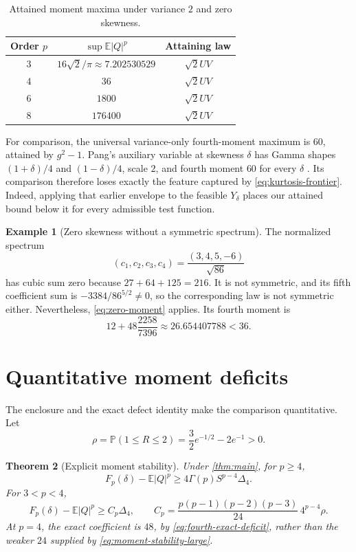 \documentclass[11pt]{article}
\numberwithin{equation}{section}
\newtheorem{theorem}{Theorem}[section]
\theoremstyle{definition}
\newtheorem{example}[theorem]{Example}
\theoremstyle{remark}
\newcommand{\E}{\mathbb E}
\newcommand{\Prob}{\mathbb P}
\newcommand{\gapfour}{\Delta_4}
\begin{document}
\begin{table}[htbp]
\centering
\caption{Attained moment maxima under variance $2$ and zero skewness.}
\begin{tabular}{@{}ccc@{}}
\toprule
Order $p$ & $\sup\E|Q|^p$ & Attaining law\\
\midrule
$3$ & $16\sqrt2/\pi\approx7.202530529$ & $\sqrt2 UV$\\
$4$ & $36$ & $\sqrt2 UV$\\
$6$ & $1800$ & $\sqrt2 UV$\\
$8$ & $176400$ & $\sqrt2 UV$\\
\bottomrule
\end{tabular}
\label{tab:moments}
\end{table}

For comparison, the universal variance-only fourth-moment maximum is $60$, attained by $g^2-1$. Pang's auxiliary variable at skewness $\delta$ has Gamma shapes $(1+\delta)/4$ and $(1-\delta)/4$, scale $2$, and fourth moment $60$ for every $\delta$ \cite{Pang2026}. Its comparison therefore loses exactly the feature captured by \eqref{eq:kurtosis-frontier}. Indeed, applying that earlier envelope to the feasible $Y_\delta$ places our attained bound below it for every admissible test function.

\begin{example}[Zero skewness without a symmetric spectrum]\label{ex:nonsymmetric}
The normalized spectrum
\[
(c_1,c_2,c_3,c_4)=\frac{(3,4,5,-6)}{\sqrt{86}}
\]
has cubic sum zero because $27+64+125=216$. It is not symmetric, and its fifth coefficient sum is $-3384/86^{5/2}\ne0$, so the corresponding law is not symmetric either. Nevertheless, \eqref{eq:zero-moment} applies. Its fourth moment is
\[
12+48\frac{2258}{7396}\approx26.654407788<36.
\]
\end{example}

\section{Quantitative moment deficits}
\label{sec:moment-stability}

The enclosure and the exact defect identity make the comparison quantitative. Let
\begin{equation}\label{eq:rho}
\rho=\Prob(1\leq R\leq2)=\frac32e^{-1/2}-2e^{-1}>0.
\end{equation}

\begin{theorem}[Explicit moment stability]\label{thm:moment-stability}
Under \cref{thm:main}, for $p\geq4$,
\begin{equation}\label{eq:moment-stability-large}
F_p(\delta)-\E|Q|^p\geq
4\Gamma(p)S^{p-4}\gapfour.
\end{equation}
For $3<p<4$,
\begin{equation}\label{eq:moment-stability-small}
F_p(\delta)-\E|Q|^p\geq C_p\gapfour,
\qquad
C_p=\frac{p(p-1)(p-2)(p-3)}{24}\,4^{p-4}\rho.
\end{equation}
At $p=4$, the exact coefficient is $48$, by \eqref{eq:fourth-exact-deficit}, rather than the weaker $24$ supplied by \eqref{eq:moment-stability-large}.
\end{theorem}
\end{document}
